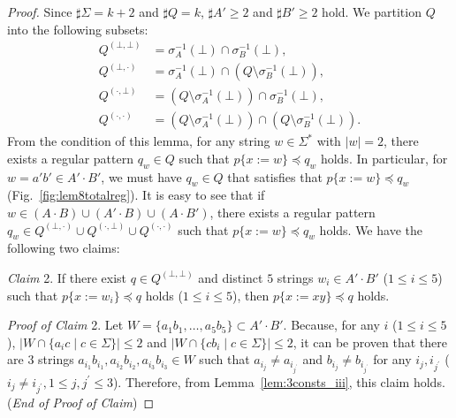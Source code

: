 \begin{proof}
Since $\sharp \Sigma = k + 2$ and $\sharp Q = k$, $\sharp A' \geq 2$ and $\sharp B' \geq 2$ hold.
We partition $Q$ into the following subsets:
\begin{align*}
  Q^{(\bot,\bot)} & = \sigma_{A}^{-1}(\bot) \cap \sigma_{B}^{-1}(\bot),\\
  Q^{(\bot,\cdot)} & = \sigma_{A}^{-1}(\bot) \cap (Q\setminus \sigma_{B}^{-1}(\bot)),\\
  Q^{(\cdot,\bot)} & = (Q\setminus \sigma_{A}^{-1}(\bot)) \cap \sigma_{B}^{-1}(\bot),\\
  Q^{(\cdot,\cdot)} & = (Q\setminus \sigma_{A}^{-1}(\bot)) \cap (Q\setminus \sigma_{B}^{-1}(\bot)).
\end{align*}
From the condition of this lemma, for any string $w \in \Sigma^{\ast}$ with $|w|=2$, there exists a regular pattern $q_{w} \in Q$ such that $p \{ x:=w \} \preceq q_{w}$ holds.
In particular, for $w=a'b'\in A'\cdot B'$, we must have $q_{w} \in Q$ that satisfies that $p \{ x:=w \} \preceq q_{w}$ (Fig.~\ref{fig:lem8totalreg}).
It is easy to see that if $w \in (A\cdot B) \cup (A'\cdot B) \cup (A\cdot B')$, there exists a regular pattern $q_{w} \in Q^{(\bot,\cdot)} \cup Q^{(\cdot,\bot)} \cup Q^{(\cdot,\cdot)}$ such that $p \{ x:=w \} \preceq q_{w}$ holds.
We have the following two claims:
\smallskip

\noindent
\textit{Claim} 2. If there exist $q \in Q^{(\bot,\bot)}$ and distinct $5$ strings $w_{i} \in A'\cdot B'$ ($1\leq i\leq 5$) such  that $p \{ x:=w_{i} \} \preceq q$ holds ($1\leq i\leq 5$),  then $p \{ x:=xy \} \preceq q$ holds.

\smallskip

\noindent
\textit{Proof of Claim} 2.
Let $W = \{a_{1}b_{1},\ldots,a_{5}b_{5}\} \subset A'\cdot B'$.
Because, for any $i$ ($1\leq i\leq 5$), $|W \cap \{a_{i}c \mid c \in \Sigma\}| \leq 2$ and  $|W \cap \{cb_{i} \mid c \in \Sigma\}| \leq 2$, it can be proven that there are $3$ strings $a_{i_{1}}b_{i_{1}},a_{i_{2}}b_{i_{2}},a_{i_{3}}b_{i_{3}}\in W$ such that $a_{i_{j}} \not= a_{i_{j^{\prime}}}$ and $b_{i_{j}} \not= b_{i_{j^{\prime}}}$ for any $i_{j},i_{j^{\prime}}$ ($i_{j}\not= i_{j^{\prime}}, 1\leq j,j^{\prime}\leq 3$).
Therefore, from Lemma~\ref{lem:3consts_iii}, this claim holds. (\textit{End of Proof of Claim})


\end{proof}
